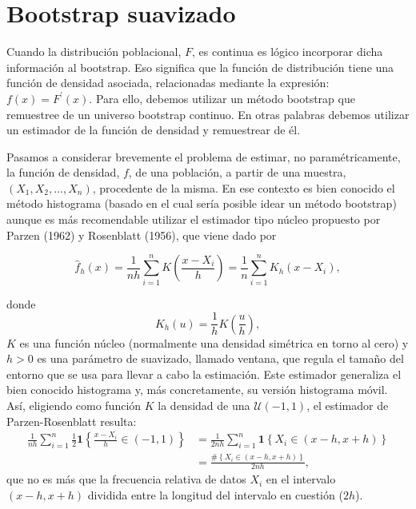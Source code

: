 \documentclass[
]{book}
\theoremstyle{definition}
\theoremstyle{definition}
\theoremstyle{definition}
\theoremstyle{remark}
\begin{document}
\hypertarget{cap4-boot-suav}{%
\section{Bootstrap suavizado}\label{cap4-boot-suav}}

Cuando la distribución poblacional, \(F\), es continua es lógico
incorporar dicha información al bootstrap. Eso significa que la función
de distribución tiene una función de densidad asociada, relacionadas
mediante la expresión: \(f\left( x \right) =F^{\prime}\left( x \right)\). Para ello, debemos utilizar un método bootstrap que
remuestree de un universo bootstrap continuo. En otras palabras debemos
utilizar un estimador de la función de densidad y remuestrear de él.

Pasamos a considerar brevemente el problema de estimar, no
paramétricamente, la función de densidad, \(f\), de una población, a
partir de una muestra, \(\left( X_1,X_2,\ldots ,X_n \right)\),
procedente de la misma. En ese contexto es bien conocido el método
histograma (basado en el cual sería posible idear un método bootstrap)
aunque es más recomendable utilizar el estimador tipo núcleo propuesto
por Parzen (1962) y Rosenblatt (1956), que viene dado por

\[\hat{f}_{h}\left( x \right) =\frac{1}{nh}\sum_{i=1}^{n}K\left( \frac{x-X_i}{
h} \right) =\frac{1}{n}\sum_{i=1}^{n}K_{h}\left( x-X_i \right),\]

donde
\[K_{h}\left( u \right) =\frac{1}{h}K\left( \frac{u}{h} \right),\]
\(K\) es una función núcleo (normalmente una densidad simétrica en torno
al cero) y \(h>0\) es una parámetro de suavizado, llamado ventana, que
regula el tamaño del entorno que se usa para llevar a cabo la
estimación. Este estimador generaliza el bien conocido histograma y, más
concretamente, su versión histograma móvil. Así, eligiendo como función
\(K\) la densidad de una \(\mathcal{U}\left( -1,1 \right)\), el estimador de
Parzen-Rosenblatt resulta:
\[\begin{aligned}
\frac{1}{nh}\sum_{i=1}^{n}\frac{1}{2}\mathbf{1}\left\{ \frac{x-X_i}{h}\in
\left( -1,1 \right) \right\} &= \frac{1}{2nh}\sum_{i=1}^{n}\mathbf{1}\left\{
X_i\in \left( x-h,x+h \right) \right\} \\
&= \frac{\#\left\{ X_i\in \left( x-h,x+h \right) \right\} }{2nh},
\end{aligned}\]
que no es más que la frecuencia relativa de datos \(X_i\) en el
intervalo \(\left( x-h,x+h \right)\) dividida entre la longitud del
intervalo en cuestión (\(2h\)).
\end{document}
